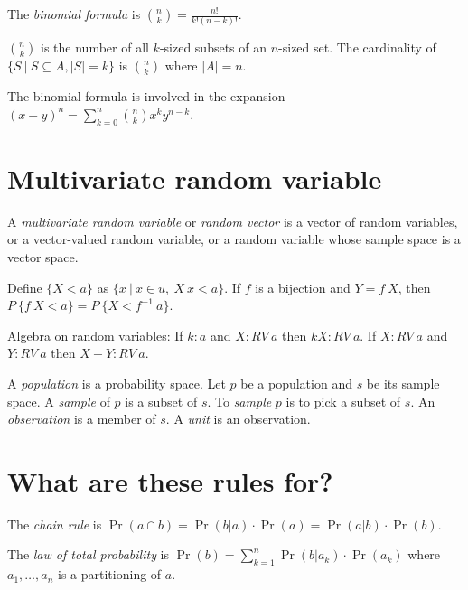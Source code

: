 The \emph{binomial formula} is \(\binom{n}{k} = \frac{n!}{k!(n-k)!}\).

\(\binom{n}{k}\) is the number of all \(k\)-sized subsets of an \(n\)-sized set.
The cardinality of \(\{ S ~|~ S \subseteq A, |S| = k \}\) is \(\binom{n}{k}\)
where \(|A| = n\).

The binomial formula is involved in the expansion \((x+y)^n = \sum_{k=0}^n \binom{n}{k} x^k y^{n-k}\).

\section{Multivariate random variable}

%
%
%
%
%
A \emph{multivariate random variable} or \emph{random vector}
is a vector of random variables,
or a vector-valued random variable,
or a random variable whose sample space is a vector space.

Define \(\{ X < a \}\) as \(\{ x ~|~ x \in u, ~ X~x < a \}\).
If \(f\) is a bijection and \(Y = f~X\),
then \(P~\{f~X < a\} = P~\{X < f^{-1}~a\}\).

Algebra on random variables:
If \(k : a\) and \(X : RV~a\) then \(k X : RV~a\).
If \(X : RV~a\) and \(Y : RV~a\) then \(X+Y : RV~a\).

%
%
%
%
%
%
%
%
A \emph{population} is a probability space.
Let \(p\) be a population and \(s\) be its sample space.
A \emph{sample} of \(p\) is a subset of \(s\).
To \emph{sample} \(p\) is to pick a subset of \(s\).
An \emph{observation} is a member of \(s\).
A \emph{unit} is an observation.

\section{What are these rules for?}

%
%
%
The \emph{chain rule} is \(\Pr(a \cap b) = \Pr(b|a) \cdot \Pr(a) = \Pr(a|b) \cdot \Pr(b)\).

%
%
%
The \emph{law of total probability} is \(\Pr(b) = \sum_{k=1}^n \Pr(b|a_k) \cdot \Pr(a_k) \)
where \(a_1,\ldots,a_n\) is a partitioning of \(a\).


